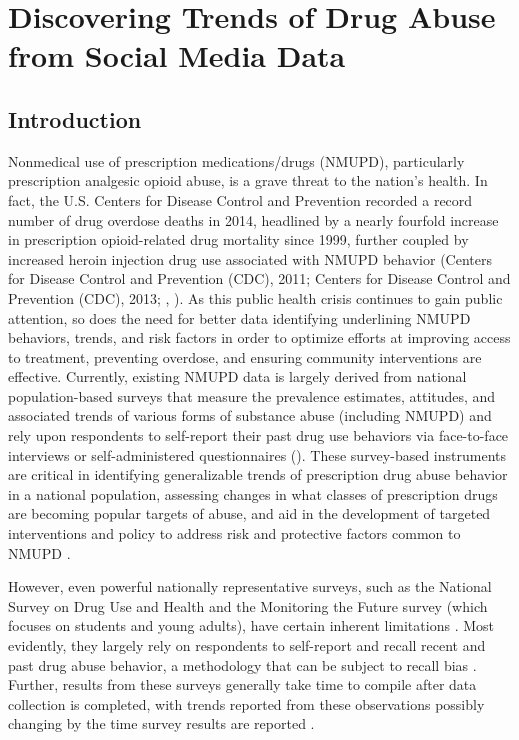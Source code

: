 \chapter{Discovering Trends of Drug Abuse from Social Media Data}
\label{AB_chapter}
\section{Introduction}
Nonmedical use of prescription medications/drugs (NMUPD), 
particularly prescription analgesic opioid abuse, 
is a grave threat to the nation's health. 
In fact, the U.S. Centers for Disease Control and Prevention 
recorded a record number of drug overdose deaths in 2014, 
headlined by a nearly fourfold increase in prescription 
opioid-related drug mortality since 1999, 
further coupled by increased heroin injection drug use 
associated with NMUPD behavior 
(Centers for Disease Control and Prevention (CDC), 2011;  
Centers for Disease Control and Prevention (CDC), 2013; 
\cite{compton2016relationship}, \cite{rudd2016increases}). 
As this public health crisis continues to gain public attention, 
so does the need for better data identifying underlining 
NMUPD behaviors, trends, and risk factors in order to optimize 
efforts at improving access to treatment, 
preventing overdose, and ensuring community interventions are effective. 
Currently, existing NMUPD data is largely derived from national 
population-based surveys that measure the prevalence estimates, 
attitudes, and associated trends of various forms of substance abuse (including NMUPD) 
and rely upon respondents to self-report their past drug use 
behaviors via face-to-face interviews or self-administered questionnaires 
(\cite{katsuki2015establishing, schepis2016trends}). 
These survey-based instruments are critical in identifying 
generalizable trends of prescription drug abuse behavior in a 
national population, assessing changes in what classes of prescription drugs 
are becoming popular targets of abuse, and aid in the development of 
targeted interventions and policy to address risk and protective factors common to 
NMUPD \cite{han2015nonmedical}.

However, even powerful nationally representative surveys, 
such as the National Survey on Drug Use and Health and the Monitoring 
the Future survey (which focuses on students and young adults), 
have certain inherent limitations \cite{schepis2016trends,mccabe2012co,mccabe2013leftover}. 
Most evidently, they largely rely on respondents to self-report and recall recent 
and past drug abuse behavior, a methodology that can be subject to 
recall bias \cite{harrison1997validity}. Further, results from these 
surveys generally take time to compile after data collection is completed, 
with trends reported from these observations possibly changing by the time survey results are 
reported \cite{katsuki2015establishing}.

